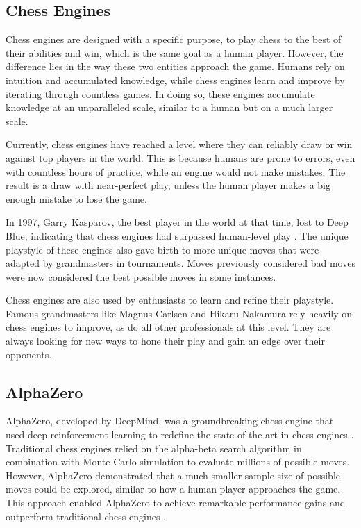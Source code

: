 \begin{spacing}{2.0}
\section{Chess Engines}

Chess engines are designed with a specific purpose, to play chess to the best of their abilities and win, which is the same goal as a human player. However, the difference lies in the way these two entities approach the game. Humans rely on intuition and accumulated knowledge, while chess engines learn and improve by iterating through countless games. In doing so, these engines accumulate knowledge at an unparalleled scale, similar to a human but on a much larger scale.

Currently, chess engines have reached a level where they can reliably draw or win against top players in the world. This is because humans are prone to errors, even with countless hours of practice, while an engine would not make mistakes. The result is a draw with near-perfect play, unless the human player makes a big enough mistake to lose the game.

In 1997, Garry Kasparov, the best player in the world at that time, lost to Deep Blue, indicating that chess engines had surpassed human-level play \cite{matchCentury}. The unique playstyle of these engines also gave birth to more unique moves that were adapted by grandmasters in tournaments. Moves previously considered bad moves were now considered the best possible moves in some instances.

Chess engines are also used by enthusiasts to learn and refine their playstyle. Famous grandmasters like Magnus Carlsen and Hikaru Nakamura rely heavily on chess engines to improve, as do all other professionals at this level. They are always looking for new ways to hone their play and gain an edge over their opponents.
 
\subsection{AlphaZero}

AlphaZero, developed by DeepMind, was a groundbreaking chess engine that used deep reinforcement learning to redefine the state-of-the-art in chess engines \cite{alphazero}. Traditional chess engines relied on the alpha-beta search algorithm in combination with Monte-Carlo simulation to evaluate millions of possible moves. However, AlphaZero demonstrated that a much smaller sample size of possible moves could be explored, similar to how a human player approaches the game. This approach enabled AlphaZero to achieve remarkable performance gains and outperform traditional chess engines \cite{MasteringChessShogi}.


\end{spacing}
